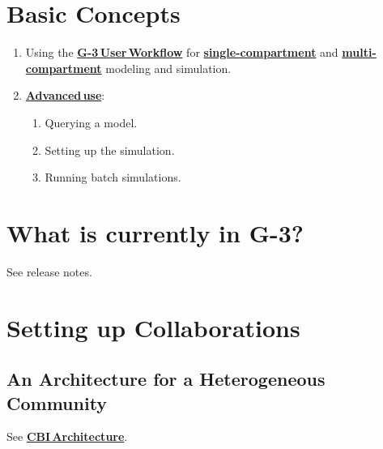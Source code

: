 \documentclass[12pt]{article}
\begin{document}
\section{Basic Concepts}

\begin{enumerate}
\item Using the \href{../workflow-user/workflow-user.tex}{\bf G-3\,User\,Workflow} for
  \href{../tutorial1/tutorial1.tex}{\bf single-compartment} and
  \href{../tutorial2/tutorial2.tex}{\bf multi-compartment} modeling and
  simulation.
\item \href{../tutorial3/tutorial3.tex}{\bf Advanced\,use}:
  \begin{enumerate}
  \item Querying a model.
  \item Setting up the simulation.
  \item Running batch simulations.
  \end{enumerate}
\end{enumerate}

\section{What is currently in G-3?}

See release notes.


\section{Setting up Collaborations}

\subsection{An Architecture for a Heterogeneous Community}

See \href{../genesis-overview/genesis-overview.tex}{\bf CBI\,Architecture}.
\end{document}
